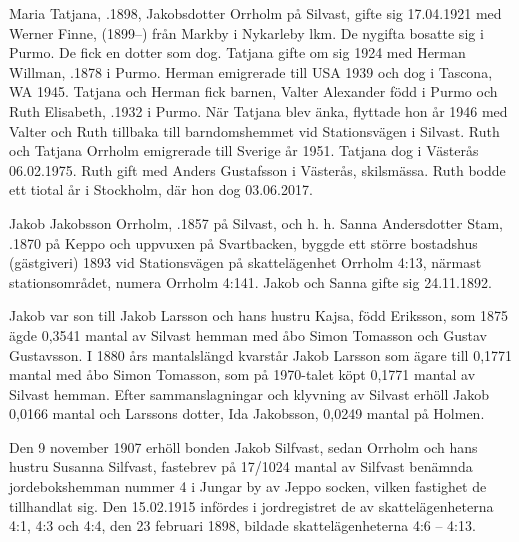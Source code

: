 Maria Tatjana, .1898, Jakobsdotter Orrholm på Silvast, gifte sig 17.04.1921 med Werner Finne, (1899--) från Markby i Nykarleby lkm. De nygifta bosatte sig i Purmo. De fick en dotter som dog. Tatjana gifte om sig 1924 med Herman Willman, .1878 i Purmo. Herman emigrerade till USA 1939 och dog i Tascona, WA 1945. Tatjana och Herman fick barnen, Valter Alexander född i Purmo och Ruth Elisabeth, .1932 i Purmo. När Tatjana blev änka, flyttade hon år 1946 med Valter och Ruth tillbaka till barndomshemmet vid Stationsvägen i Silvast. Ruth och Tatjana Orrholm emigrerade till Sverige år 1951. Tatjana dog i Västerås 06.02.1975. Ruth gift med Anders Gustafsson i Västerås, skilsmässa. Ruth bodde ett tiotal år i Stockholm, där hon dog 03.06.2017.


Jakob Jakobsson Orrholm, .1857 på Silvast, och h. h. Sanna Andersdotter Stam, .1870 på Keppo och uppvuxen på Svartbacken, byggde ett större bostadshus (gästgiveri) 1893 vid Stationsvägen på skattelägenhet Orrholm 4:13, närmast stationsområdet, numera Orrholm 4:141. Jakob och Sanna gifte sig 24.11.1892.

Jakob var son till Jakob Larsson och hans hustru Kajsa, född Eriksson, som 1875 ägde 0,3541 mantal av Silvast hemman med åbo Simon Tomasson och Gustav Gustavsson. I 1880 års mantalslängd kvarstår Jakob Larsson som ägare till 0,1771 mantal med åbo Simon Tomasson, som på 1970-talet köpt 0,1771 mantal av Silvast hemman. Efter sammanslagningar och klyvning av Silvast erhöll Jakob 0,0166 mantal och Larssons dotter, Ida Jakobsson, 0,0249 mantal på Holmen.

Den 9 november 1907 erhöll bonden Jakob Silfvast, sedan Orrholm och hans hustru Susanna Silfvast, fastebrev på 17/1024 mantal av Silfvast benämnda jordebokshemman nummer 4 i Jungar by av Jeppo socken, vilken fastighet de tillhandlat sig.
Den 15.02.1915 infördes i jordregistret de av skattelägenheterna 4:1, 4:3 och 4:4, den 23 februari 1898, bildade skattelägenheterna 4:6 – 4:13.

